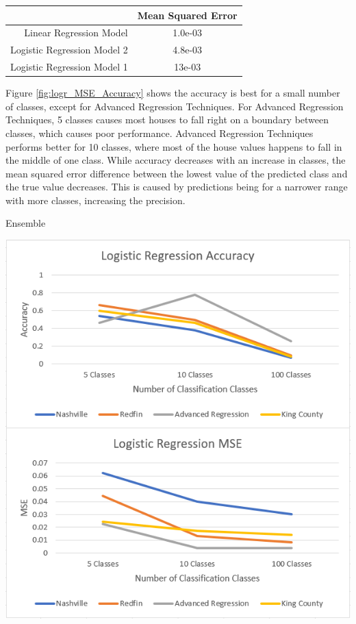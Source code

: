 \documentclass[10pt]{article}
\begin{document}
\begin{multicols}{2}
\begin{tabular}{r|c}
				& \small{Mean Squared Error} \\
				\hline
				\small{Linear Regression Model} & \small{1.0e-03} \\
				\hline
				\small{Logistic Regression Model 2} & \small{4.8e-03} \\
				\hline
				\small{Logistic Regression Model 1} & \small{13e-03} \\
				\hline
			\end{tabular}
			\label{table:logr_performance}        
			\setlength{\parindent}{15pt}
		\par
			Figure \ref{fig:logr_MSE_Accuracy} shows the accuracy is best for a small number of classes, except for Advanced Regression Techniques. For Advanced Regression Techniques, 5 classes causes most houses to fall right on a boundary between classes, which causes poor performance. Advanced Regression Techniques performs better for 10 classes, where most of the house values happens to fall in the middle of one class. While accuracy decreases with an increase in classes, the mean squared error difference between the lowest value of the predicted class and the true value decreases. This is caused by predictions being for a narrower range with more classes, increasing the precision.
		\par
			Ensemble
		\par
		\begin{center}
	            \captionsetup{type=figure}
			\includegraphics[scale=0.38]{Images/LogisticRegressionMSEAccuracy} \\

\end{center}
\end{multicols}
\end{document}
